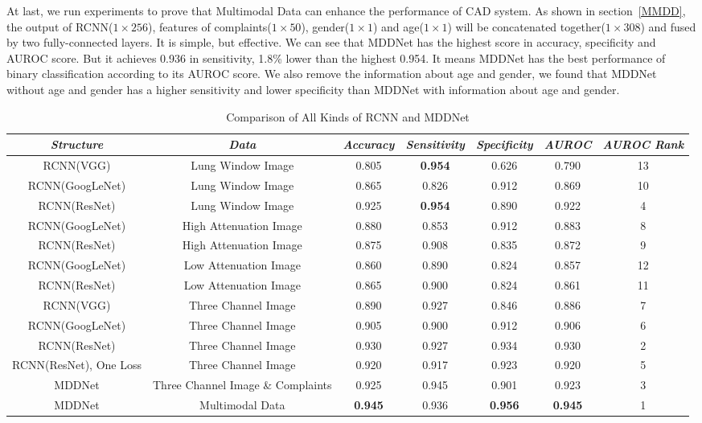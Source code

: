 At last, we run experiments to prove that Multimodal Data can enhance the performance of CAD system. As shown in section~\ref{MMDD}, the output of RCNN($1 \times 256$), features of complaints($1 \times 50$), gender($1 \times 1$) and age($1 \times 1$) will be concatenated together($1 \times 308$) and fused by two fully-connected layers. It is simple, but effective. We can see that MDDNet has the highest score in accuracy, specificity and AUROC score. But it achieves 0.936 in sensitivity, 1.8\% lower than the highest 0.954. It means MDDNet has the best performance of binary classification according to its AUROC score. We also remove the information about age and gender, we found that MDDNet without age and gender has a higher sensitivity and lower specificity than MDDNet with information about age and gender. 
\begin{table}[htb]
    \vspace{-0cm}
    \caption{Comparison of All Kinds of RCNN and MDDNet}
    \vspace{-0cm}
    \begin{center}
    \begin{tabular}{|c|c|c|c|c|c|c|}
    \hline
    \textbf{\textit{Structure}} & \textbf{\textit{Data}}& \textbf{\textit{Accuracy}}  & \textbf{\textit{Sensitivity}} & \textbf{\textit{Specificity}} & \textbf{\textit{AUROC}}& \textbf{\textit{AUROC Rank}}\\
    \hline
    RCNN(VGG) & Lung Window Image & 0.805 & {\bfseries 0.954} &0.626 &0.790 &13\\
    RCNN(GoogLeNet) & Lung Window Image& 0.865 & 0.826 & 0.912 & 0.869 &10\\
    RCNN(ResNet) & Lung Window Image & 0.925 & {\bfseries 0.954} & 0.890 & 0.922 &4\\
    RCNN(GoogLeNet) & High Attenuation Image& 0.880 & 0.853 & 0.912 & 0.883 &8\\
    RCNN(ResNet)& High Attenuation Image& 0.875 & 0.908 & 0.835 & 0.872 &9\\
    RCNN(GoogLeNet) & Low Attenuation Image& 0.860 & 0.890 & 0.824 & 0.857 &12\\
    RCNN(ResNet) & Low Attenuation Image& 0.865 & 0.900 & 0.824 & 0.861 &11\\
    RCNN(VGG) & Three Channel Image& 0.890 & 0.927 &0.846 &0.886 &7\\
    RCNN(GoogLeNet)& Three Channel Image & 0.905 & 0.900 & 0.912 & 0.906 &6\\
    RCNN(ResNet) & Three Channel Image& 0.930 & 0.927 & 0.934 & 0.930 &2\\
    RCNN(ResNet), One Loss & Three Channel Image& 0.920 & 0.917 & 0.923 & 0.920 &5\\
    MDDNet & Three Channel Image \& Complaints & 0.925 & 0.945 & 0.901 & 0.923 &3\\
    MDDNet & Multimodal Data&  {\bfseries 0.945} & 0.936 & {\bfseries 0.956} & {\bfseries 0.945} &1\\
    \hline
    \end{tabular}
    \vspace{-0cm}
    \label{comparison}
    \end{center}
    \vspace{-0cm}
    \end{table}
